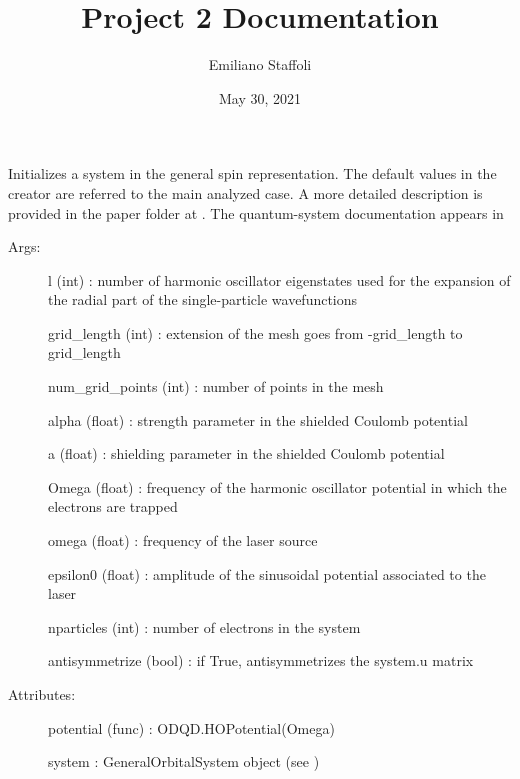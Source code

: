 \documentclass[letterpaper,10pt,english]{sphinxmanual}
\title{Project 2 Documentation}
\date{May 30, 2021}
\author{Emiliano Staffoli}
\begin{document}
\pagestyle{empty}
\sphinxmaketitle
\pagestyle{plain}
\sphinxtableofcontents
\pagestyle{normal}
\label{\detokenize{index::doc}}


\begin{fulllineitems}
\label{\detokenize{index:do.GHF}}
Initializes a system in the general spin representation. The default values in the creator are referred to the main analyzed case.
A more detailed description is provided in the paper folder at .
The quantum-system documentation appears in 
\begin{description}
\item[{Args:}] \leavevmode
l (int) : number of harmonic oscillator eigenstates used for the expansion of the radial part of the single-particle wavefunctions

grid\_length (int) : extension of the mesh goes from -grid\_length to grid\_length

num\_grid\_points (int) : number of points in the mesh

alpha (float) : strength parameter in the shielded Coulomb potential

a (float) : shielding parameter in the shielded Coulomb potential

Omega (float) : frequency of the harmonic oscillator potential in which the electrons are trapped

omega (float) : frequency of the laser source

epsilon0 (float) : amplitude of the sinusoidal potential associated to the laser

nparticles (int) : number of electrons in the system

antisymmetrize (bool) : if True, antisymmetrizes the system.u matrix

\item[{Attributes:}] \leavevmode
potential (func) : ODQD.HOPotential(Omega)

system : GeneralOrbitalSystem object (see )


\end{description}
\end{fulllineitems}
\end{document}
